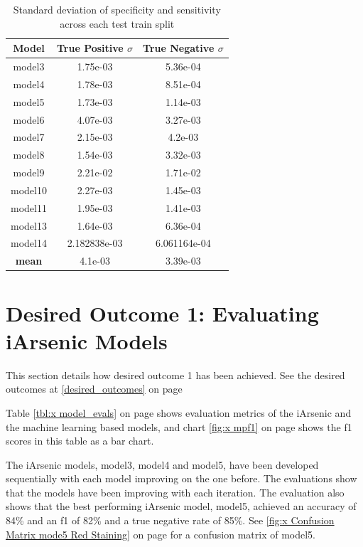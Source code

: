 \begin{table}
    \centering
    \begin{tabular}{c c c} 
         \toprule
         Model & True Positive $\sigma$ & True Negative $\sigma$ \\
         \midrule
         model3 & 1.75e-03 & 5.36e-04\\
         model4 & 1.78e-03 & 8.51e-04\\ 
         model5 & 1.73e-03 & 1.14e-03\\
         model6 & 4.07e-03 & 3.27e-03\\
         model7 & 2.15e-03 & 4.2e-03\\
         model8 & 1.54e-03 & 3.32e-03\\ 
         model9 & 2.21e-02 & 1.71e-02\\
         model10 & 2.27e-03 & 1.45e-03\\
         model11 & 1.95e-03 & 1.41e-03\\
         model13 & 1.64e-03 & 6.36e-04\\
         model14 & 2.182838e-03 & 6.061164e-04\\
         \hline
         \textbf{mean} & 4.1e-03 & 3.39e-03 \\
         \bottomrule
    \end{tabular}
    \caption{Standard deviation of specificity and sensitivity across each test train split}
    \label{tbl:x kf_std_cm}
\end{table}

\newpage

\section{Desired Outcome 1: Evaluating iArsenic Models}

This section details how desired outcome 1 has been achieved. See the desired outcomes at \ref{desired_outcomes} on page \pageref{desired_outcomes}

Table \ref{tbl:x model_evals} on page \pageref{tbl:x model_evals} shows evaluation metrics of the iArsenic and the machine learning based models, and chart \ref{fig:x mpf1} on page \pageref{fig:x mpf1} shows the f1 scores in this table as a bar chart.

The iArsenic models, model3, model4 and model5, have been developed sequentially with each model improving on the one before. The evaluations show that the models have been improving with each iteration. The evaluation also shows that the best performing iArsenic model, model5, achieved an accuracy of 84\% and an f1 of 82\% and a true negative rate of 85\%. See \ref{fig:x Confusion Matrix mode5 Red Staining} on page \pageref{fig:x Confusion Matrix mode5 Red Staining} for a confusion matrix of model5.

